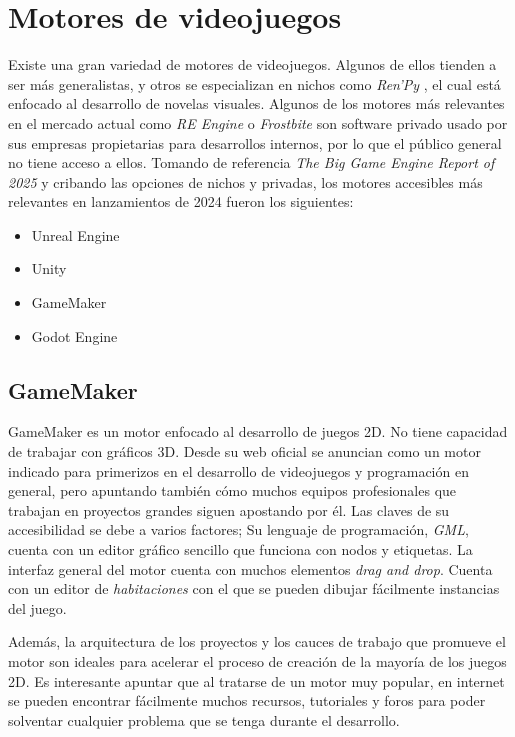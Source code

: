 \section{Motores de videojuegos}

Existe una gran variedad de motores de videojuegos. Algunos de ellos tienden a ser más generalistas, y otros se especializan en nichos como \textit{Ren'Py} \cite{renpy}, el cual está enfocado al desarrollo de novelas visuales. Algunos de los motores más relevantes en el mercado actual como \textit{RE Engine} o \textit{Frostbite} son software privado usado por sus empresas propietarias para desarrollos internos, por lo que el público general no tiene acceso a ellos. Tomando de referencia \textit{The Big Game Engine Report of 2025} \cite{game-engine-report} y cribando las opciones de nichos y privadas, los motores accesibles más relevantes en lanzamientos de 2024 fueron los siguientes:

\begin{itemize}
    \item Unreal Engine
    \item Unity
    \item GameMaker
    \item Godot Engine
\end{itemize}

\subsection{GameMaker}

GameMaker \cite{gamemaker} es un motor enfocado al desarrollo de juegos 2D. No tiene capacidad de trabajar con gráficos 3D. Desde su web oficial se anuncian como un motor indicado para primerizos en el desarrollo de videojuegos y programación en general, pero apuntando también cómo muchos equipos profesionales que trabajan en proyectos grandes siguen apostando por él. Las claves de su accesibilidad se debe a varios factores; Su lenguaje de programación, \textit{GML}, cuenta con un editor gráfico sencillo que funciona con nodos y etiquetas. La interfaz general del motor cuenta con muchos elementos \textit{drag and drop}. Cuenta con un editor de \textit{habitaciones} con el que se pueden dibujar fácilmente instancias del juego.

Además, la arquitectura de los proyectos y los cauces de trabajo que promueve el motor son ideales para acelerar el proceso de creación de la mayoría de los juegos 2D. Es interesante apuntar que al tratarse de un motor muy popular, en internet se pueden encontrar fácilmente muchos recursos, tutoriales y foros para poder solventar cualquier problema que se tenga durante el desarrollo.

